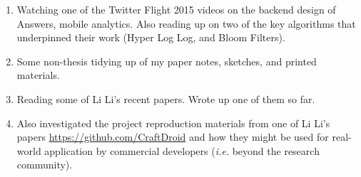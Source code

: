 \begin{enumerate}
    \item Watching one of the Twitter Flight 2015 videos on the backend design of Answers, mobile analytics. Also reading up on two of the key algorithms that underpinned their work (Hyper Log Log, and Bloom Filters).
    \item Some non-thesis tidying up of my paper notes, sketches, and printed materials.
    \item Reading some of Li Li's recent papers. Wrote up one of them so far.
    \item Also investigated the project reproduction materials from one of Li Li's papers \url{https://github.com/CraftDroid} and how they might be used for real-world application by commercial developers (\textit{i.e.} beyond the research community).
\end{enumerate}
